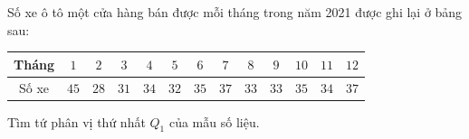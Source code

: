 \begin{ex}
Số xe ô tô một cửa hàng bán được mỗi tháng trong năm 2021 được ghi lại ở bảng sau:
\begin{center}
\begin{tabular}{|c|c|c|c|c|c|c|c|c|c|c|c|c|}\hline
Tháng & $1$ & $2$ & $3$ & $4$ & $5$ & $6$ & $7$ & $8$ & $9$ & $10$ & $11$ & $12$\\\hline
Số xe & $45$ & $28$ & $31$ & $34$ & $32$ & $35$ & $37$ & $33$ & $33$ & $35$ & $34$ & $37$\\\hline
\end{tabular}
\end{center}
Tìm tứ phân vị thứ nhất $Q_1$ của mẫu số liệu.
\end{ex}

